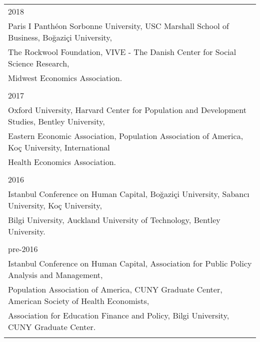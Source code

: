 \documentclass[12 pt]{article}
\begin{document}
\begin{longtable}{ccccc}
 \\ 
  \multicolumn{5}{l}{2018}\\
     \multicolumn{5}{l}{Paris I Panth\'{e}on Sorbonne University,  USC Marshall School of Business, Bo\u{g}azi\c{c}i University,} \\
   \multicolumn{5}{l}{The Rockwool Foundation, VIVE - The Danish Center for Social Science Research,} \\
      \multicolumn{5}{l}{Midwest Economics Association.} \\
\\
  \multicolumn{5}{l}{2017}\\

 \multicolumn{5}{l}{Oxford University, Harvard Center for Population and Development Studies, Bentley University,  }\\
  \multicolumn{5}{l}{Eastern Economic Association, Population Association of America,  Ko\c{c} University, International}\\
    \multicolumn{5}{l}{Health Economics Association.}\\
  

\\
   
   \multicolumn{5}{l}{2016}\\

 \multicolumn{5}{l}{Istanbul Conference on Human Capital,  Bo\u{g}azi\c{c}i University, Sabanc{\i} University, Ko\c{c} University, }  \\
\multicolumn{5}{l}{ Bilgi University, Auckland University of Technology, Bentley University. }  \\
\\

   \multicolumn{5}{l}{pre-2016}\\

\multicolumn{5}{l}{Istanbul Conference on Human Capital, Association for Public Policy Analysis and Management,}  \\
\multicolumn{5}{l}{Population Association of America, CUNY Graduate Center, American Society of Health Economists,}      \\
\multicolumn{5}{l}{Association for Education Finance and Policy, Bilgi University, CUNY Graduate Center.}
 \\
 \\


\end{longtable}
\end{document}
